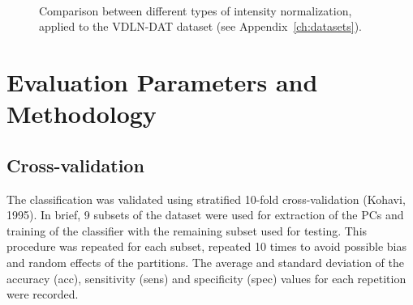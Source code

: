 \begin{figure}[bth]
	\myfloatalign
	\quad
	\\
	\caption{Comparison between different types of intensity normalization, applied to the VDLN-DAT dataset (see Appendix~\ref{ch:datasets}).}\label{fig:comparisonIntNorm}
\end{figure}


\section{Evaluation Parameters and Methodology}\label{sec:validation}
\subsection{Cross-validation}

The classification was validated using stratified 10-fold
cross-validation (Kohavi, 1995). In brief, 9 subsets of the dataset
were used for extraction of the PCs and training of the classifier with
the remaining subset used for testing. This procedure was repeated for
each subset, repeated 10 times to avoid possible bias and random
effects of the partitions. The average and standard deviation of the
accuracy (acc), sensitivity (sens) and specificity (spec) values for
each repetition were recorded. 

